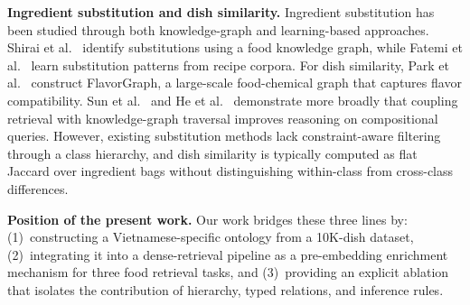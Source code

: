 \textbf{Ingredient substitution and dish similarity.}
Ingredient substitution has been studied through both knowledge-graph and learning-based approaches. Shirai et al.~\cite{shirai2021identifying} identify substitutions using a food knowledge graph, while Fatemi et al.~\cite{fatemi2023learning} learn substitution patterns from recipe corpora. For dish similarity, Park et al.~\cite{park2021flavorgraph} construct FlavorGraph, a large-scale food-chemical graph that captures flavor compatibility. Sun et al.~\cite{sun2023think} and He et al.~\cite{he2024g} demonstrate more broadly that coupling retrieval with knowledge-graph traversal improves reasoning on compositional queries. However, existing substitution methods lack constraint-aware filtering through a class hierarchy, and dish similarity is typically computed as flat Jaccard over ingredient bags without distinguishing within-class from cross-class differences.

\textbf{Position of the present work.}
Our work bridges these three lines by: (1)~constructing a Vietnamese-specific ontology from a 10K-dish dataset, (2)~integrating it into a dense-retrieval pipeline as a pre-embedding enrichment mechanism for three food retrieval tasks, and (3)~providing an explicit ablation that isolates the contribution of hierarchy, typed relations, and inference rules.

